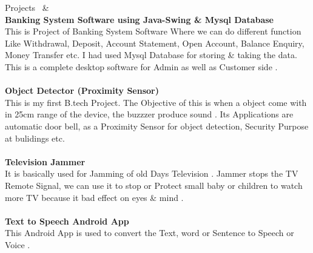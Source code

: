 \documentclass{resume} %
\begin{document}
\begin{rSection}{Projects}
{\bf }
\ &
\\{\bf Banking System Software using Java-Swing \& Mysql Database}\\
This is Project of Banking System Software  Where we can do different function Like Withdrawal, Deposit, Account Statement, Open Account, Balance Enquiry, Money Transfer etc. I had used Mysql Database for storing \& taking the data. This is a complete desktop software for Admin as well as Customer side . \\


\\{\bf Object Detector (Proximity Sensor)}\\
This is my first B.tech Project. The Objective of this is when a object come with in 25cm range of the device, the buzzzer produce sound . Its Applications are automatic door bell, as a Proximity Sensor for object detection, Security Purpose at bulidings etc.\\


\\{\bf Television Jammer}\\
It is basically used for Jamming of old Days Television . Jammer stops the TV Remote Signal, we can use it to stop or Protect small baby or children to watch more TV because it bad effect on eyes \& mind .\\


\\{\bf Text to Speech Android App}\\
This Android App is used to convert the Text, word or Sentence to Speech or Voice .\\


\end{rSection}
\end{document}
